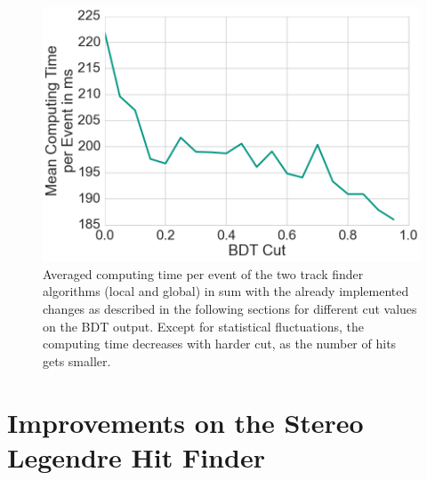 \begin{figure}
  \centering
  \includegraphics[width=0.6\linewidth]{figures/workflow/background_hit_finder_performance.png}
  \caption{Averaged computing time per event of the two track finder algorithms (local and global) in sum with the already implemented changes as described in the following sections for different cut values on the BDT output. Except for statistical fluctuations, the computing time decreases with harder cut, as the number of hits gets smaller.}
  \label{fig-performance-clusters}
\end{figure}



\section{Improvements on the Stereo Legendre Hit Finder} \label{section-stereo}

